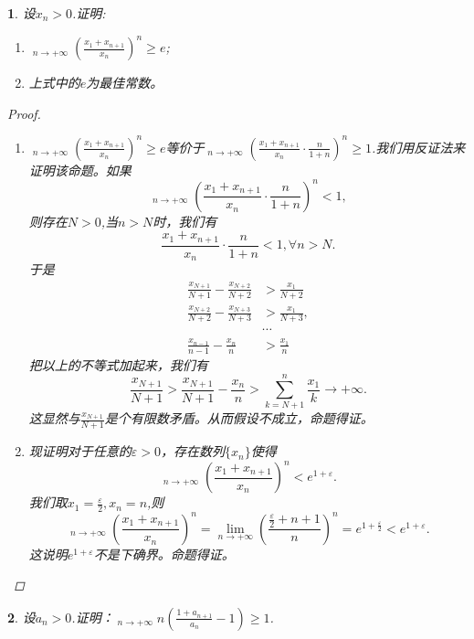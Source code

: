 \documentclass[utf8]{book}
\newtheorem{example}{}[section]             %
\DeclareMathOperator*\uplim{\overline{lim}}
\begin{document}
\begin{example}
设$x_n > 0$.证明:
\renewcommand\labelenumi{\normalfont(\theenumi)}
\begin{enumerate}
\item $\displaystyle\uplim_{n\to +\infty}\left(\frac{x_1+x_{n+1}}{x_n}\right)^n\geq e$;
\item 上式中的$e$为最佳常数。
\end{enumerate}
\begin{proof}
\renewcommand\labelenumi{\normalfont(\theenumi)}
\begin{enumerate}
\item $\displaystyle\uplim_{n\to +\infty}\left(\frac{x_1+x_{n+1}}{x_n}\right)^n\geq e$等价于$\displaystyle\uplim_{n\to +\infty}\left(\frac{x_1+x_{n+1}}{x_n}\cdot\frac{n}{1+n}\right)^{n}\geq 1$.我们用反证法来证明该命题。如果
$$\displaystyle\uplim_{n\to +\infty}\left(\frac{x_1+x_{n+1}}{x_n}\cdot\frac{n}{1+n}\right)^{n} < 1,$$则存在$N>0$,当$n > N$时，我们有
$$\frac{x_1+x_{n+1}}{x_n}\cdot\frac{n}{1+n} < 1,\forall n > N.$$
于是
\begin{equation*}
\begin{split}
\frac{x_{N+1}}{N+1}-\frac{x_{N+2}}{N+2} &> \frac{x_1}{N+2}\\
\frac{x_{N+2}}{N+2}-\frac{x_{N+3}}{N+3} &> \frac{x_1}{N+3}, \\
&\cdots\\
\frac{x_{n-1}}{n-1}-\frac{x_{n}}{n} &> \frac{x_1}{n}
\end{split}
\end{equation*}
把以上的不等式加起来，我们有
$$\frac{x_{N+1}}{N+1} > \frac{x_{N+1}}{N+1} - \frac{x_{n}}{n} > \displaystyle\sum_{k=N+1}^n\frac{x_1}{k}\rightarrow+\infty.$$
这显然与$\frac{x_{N+1}}{N+1}$是个有限数矛盾。从而假设不成立，命题得证。
\item 现证明对于任意的$\varepsilon>0$，存在数列$\{x_n\}$使得$$\displaystyle\uplim_{n\to +\infty}\left(\frac{x_1+x_{n+1}}{x_n}\right)^n< e^{1+\varepsilon}.$$我们取$x_1 = \frac{\varepsilon}{2}, x_n = n$,则
$$\displaystyle\uplim_{n\to +\infty}\left(\frac{x_1+x_{n+1}}{x_n}\right)^n = \displaystyle\lim_{n\to +\infty}\left(\frac{\frac{\varepsilon}{2}+n+1}{n}\right)^n=e^{1+\frac{\varepsilon}{2}} < e^{1+\varepsilon}.$$
这说明$e^{1+\varepsilon}$不是下确界。命题得证。
\end{enumerate}
\end{proof}
\end{example}
\begin{example}
设$a_n>0$.证明：$\displaystyle\uplim_{n\to +\infty}n\left(\frac{1+a_{n+1}}{a_n}-1\right)\geq 1$.
\end{example}
\end{document}
